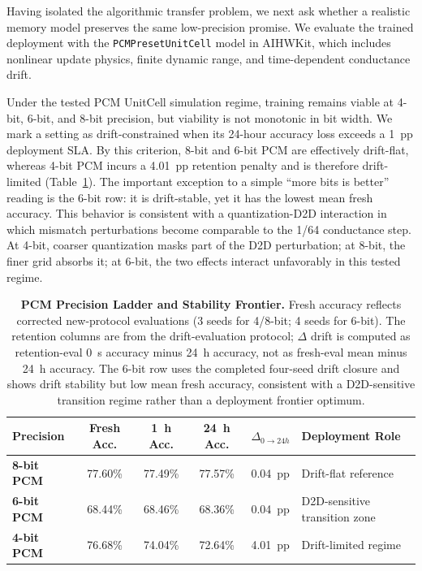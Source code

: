 Having isolated the algorithmic transfer problem, we next ask whether a realistic memory model preserves the same low-precision promise. We evaluate the trained deployment with the \texttt{PCMPresetUnitCell} model in AIHWKit, which includes nonlinear update physics, finite dynamic range, and time-dependent conductance drift.

Under the tested PCM UnitCell simulation regime, training remains viable at 4-bit, 6-bit, and 8-bit precision, but viability is not monotonic in bit width. We mark a setting as drift-constrained when its 24-hour accuracy loss exceeds a 1~pp deployment SLA. By this criterion, 8-bit and 6-bit PCM are effectively drift-flat, whereas 4-bit PCM incurs a 4.01~pp retention penalty and is therefore drift-limited (Table~\ref{tab:pcm_precision_ladder}). The important exception to a simple ``more bits is better'' reading is the 6-bit row: it is drift-stable, yet it has the lowest mean fresh accuracy. This behavior is consistent with a quantization-D2D interaction in which mismatch perturbations become comparable to the 1/64 conductance step. At 4-bit, coarser quantization masks part of the D2D perturbation; at 8-bit, the finer grid absorbs it; at 6-bit, the two effects interact unfavorably in this tested regime.

\begin{table}[htbp]
\centering
\caption{\textbf{PCM Precision Ladder and Stability Frontier.} Fresh accuracy reflects corrected new-protocol evaluations (3 seeds for 4/8-bit; 4 seeds for 6-bit). The retention columns are from the drift-evaluation protocol; $\Delta$ drift is computed as retention-eval 0~s accuracy minus 24~h accuracy, not as fresh-eval mean minus 24~h accuracy. The 6-bit row uses the completed four-seed drift closure and shows drift stability but low mean fresh accuracy, consistent with a D2D-sensitive transition regime rather than a deployment frontier optimum.}
\label{tab:pcm_precision_ladder}
\begin{tabular}{lcccll}
\toprule
\textbf{Precision} & \textbf{Fresh Acc.} & \textbf{1~h Acc.} & \textbf{24~h Acc.} & \textbf{$\Delta_{0\rightarrow24h}$} & \textbf{Deployment Role} \\
\midrule
\textbf{8-bit PCM} & 77.60\% & 77.49\% & 77.57\% & 0.04~pp & Drift-flat reference \\
\textbf{6-bit PCM} & 68.44\% & 68.46\% & 68.36\% & 0.04~pp & D2D-sensitive transition zone \\
\textbf{4-bit PCM} & 76.68\% & 74.04\% & 72.64\% & 4.01~pp & Drift-limited regime \\
\bottomrule
\end{tabular}
\end{table}

